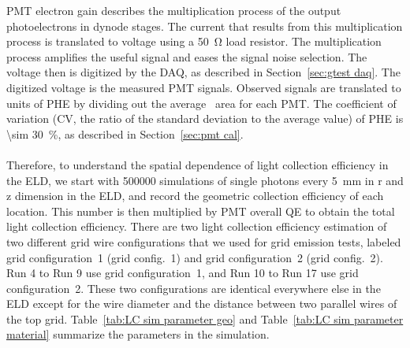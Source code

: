 PMT electron gain describes the multiplication process of the output photoelectrons in dynode stages. The current that results from this multiplication process is translated to voltage using a \SI{50}{\ohm} load resistor. The multiplication process amplifies the useful signal and eases the signal noise selection. The voltage then is digitized by the DAQ, as described in Section~\ref{sec:gtest daq}. The digitized voltage is the measured PMT signals. Observed signals are translated to units of PHE by dividing out the average \sphe\ area for each PMT. %
The coefficient of variation (CV, the ratio of the standard deviation to the average value) of PHE is \SI{\sim 30}{\percent}, as described in Section~\ref{sec:pmt cal}. 

\paragraph{}
Therefore, to understand the spatial dependence of light collection efficiency in the ELD, we start with \num{500000} simulations of single photons every \SI{5}{mm} in r and z dimension in the ELD, and record the geometric collection efficiency of each location. This number is then multiplied by PMT overall QE to obtain the total light collection efficiency. There are two light collection efficiency estimation of two different grid wire configurations that we used for grid emission tests, labeled grid configuration~1 (grid config.~1) and grid configuration~2 (grid config.~2). Run 4 to Run 9 use grid configuration~1, and Run 10 to Run 17 use grid configuration~2. These two configurations are identical everywhere else in the ELD except for the wire diameter and the distance between two parallel wires of the top grid. Table~\ref{tab:LC sim parameter geo} and Table~\ref{tab:LC sim parameter material} summarize the parameters in the simulation.


